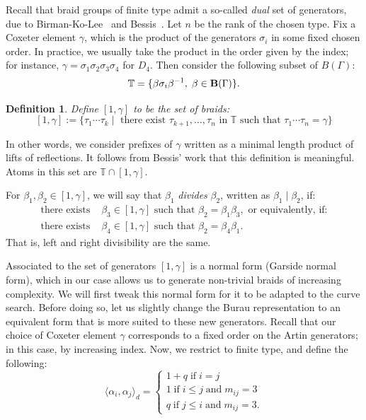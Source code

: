 \documentclass[a4paper]{amsart}
\newcommand{\0}{\mathbf{0}}
\newcommand{\B}{{\bf B}}
\theoremstyle{theorem}
\newtheorem{definition}[theorem]{Definition}
\begin{document}
Recall that braid groups of finite type admit a so-called \emph{dual} set of generators, due to Birman-Ko-Lee~\cite{BKL} and Bessis~\cite{Bessis}.
Let \(n\) be the rank of the chosen type.
Fix a Coxeter element $\gamma$, which is the product of the generators $\sigma_i$ in some fixed chosen order.
In practice, we usually take the product in the order given by the index; for instance, $\gamma=\sigma_1\sigma_2\sigma_3\sigma_4$ for $D_4$.
Then consider the following subset of \(B(\Gamma)\):
\[
\mathbb{T} =\{\beta \sigma_i\beta^{-1},\;\beta \in \B(\Gamma)\}.
\]

\begin{definition}
  Define $[1,\gamma]$ to be the set of braids:
  \[
[1,\gamma]:=  \{\tau_1\cdots \tau_k \mid \text{ there exist } \tau_{k+1},\dots,\tau_n \text{ in }\mathbb{T} \text{ such that } \tau_1\cdots \tau_n=\gamma
  \}
  \]
\end{definition}
In other words, we consider prefixes of $\gamma$ written as a minimal length product of lifts of reflections.
It follows from Bessis' work that this definition is meaningful.
Atoms in this set are $\mathbb{T}\cap [1,\gamma]$.

For $\beta_1, \beta_2\in [1,\gamma]$, we will say that \(\beta_1\) \emph{divides} \(\beta_2\), written as $\beta_1 \mid \beta_2$, if:
\begin{align*}
\text{there exists } &\beta_3\in [1,\gamma]\text{ such that } \beta_2=\beta_1\beta_3, \text{ or equivalently, if:}\\
\text{there exists } &\beta_4\in [1,\gamma]\text{ such that } \beta_2=\beta_4\beta_1.
\end{align*}
That is, left and right divisibility are the same.

Associated to the set of generators $[1,\gamma]$ is a normal form (Garside normal form), which in our case allows us to generate non-trivial braids of increasing complexity.
We will first tweak this normal form for it to be adapted to the curve search.
Before doing so, let us slightly change the Burau representation to an equivalent form that is more suited to these new generators. Recall that our choice of Coxeter element \(\gamma\) corresponds to a fixed order on the Artin generators; in this case, by increasing index.
Now, we restrict to finite type, and define the following:
\[
\langle \alpha_i,\alpha_j\rangle_d =\begin{cases}
1+q \;\text{if}\;i=j \\
1\; \text{if}\;i\leq j\;\text{and}\; m_{ij}=3 \\
q\; \text{if}\;j\leq i\;\text{and}\; m_{ij}=3.
\end{cases}
\]
\end{document}
